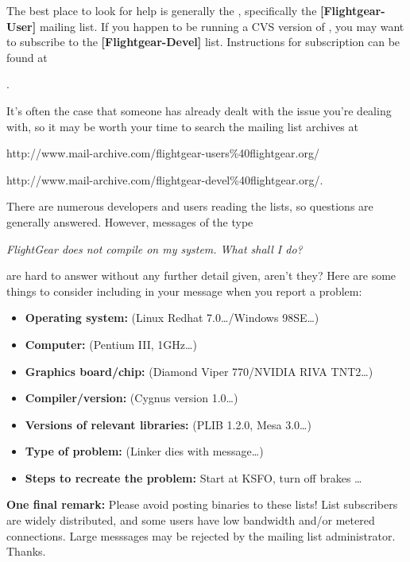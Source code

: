 The best place to look for help is generally the , specifically the  \textbf{[Flightgear-User]} mailing list. If you happen to be running a CVS version of \FlightGear{}, you may want to subscribe to the \textbf{[Flightgear-Devel]} list. Instructions for subscription can be
found at
 \medskip

.
 \medskip

\noindent
It's often the case that someone has already dealt with the issue you're dealing with, so it may be worth your time to search the mailing list archives at
 \medskip

http://www.mail-archive.com/flightgear-users\%40flightgear.org/

http://www.mail-archive.com/flightgear-devel\%40flightgear.org/.
 \medskip

\noindent
There are numerous developers and users reading the lists, so questions are generally answered. However, messages of the type

\textit{FlightGear does not compile on my system. What shall I do?}

 \noindent
are hard to answer without any further detail given, aren't they? Here are some things to consider including in your message when you report a problem:
 \medskip

\begin{itemize}
\item \textbf{Operating system:} (Linux Redhat 7.0\ldots/Windows 98SE\ldots)

\item \textbf{Computer:} (Pentium III, 1GHz\ldots)

\item \textbf{Graphics board/chip:} (Diamond Viper 770/NVIDIA RIVA TNT2\ldots)

\item \textbf{Compiler/version:} (Cygnus version 1.0\ldots)

\item \textbf{Versions of relevant libraries:} (PLIB 1.2.0, Mesa 3.0\ldots)

\item \textbf{Type of problem:} (Linker dies with message\ldots)

\item \textbf{Steps to recreate the problem:} Start at KSFO, turn off brakes \ldots

\end{itemize}

\textbf{One final remark:} Please avoid posting binaries to these lists! List subscribers are widely distributed, and some users have low bandwidth and/or metered connections. Large messsages may be rejected by the mailing list administrator. Thanks.


